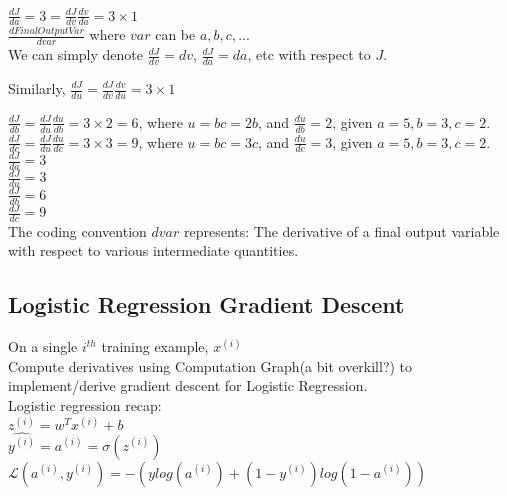 \documentclass{article}
\begin{document}
$\frac{dJ}{da} = 3 = \frac{dJ}{dv}\frac{dv}{da} = 3 \times 1$\\

$\frac{dFinalOutputVar}{dvar}$ where $var$ can be $a,b,c,...$\\

We can simply denote $\frac{dJ}{dv} = dv$,
$\frac{dJ}{da} = da$, etc with respect to $J$.

Similarly, $\frac{dJ}{du} = \frac{dJ}{dv}\frac{dv}{du} = 3\times 1$

$\frac{dJ}{db} = \frac{dJ}{du}\frac{du}{db} = 3 \times 2 = 6$, where $u=bc = 2b$, and $\frac{du}{db} = 2$, given $a=5, b=3, c=2$.\\

$\frac{dJ}{dc} = \frac{dJ}{du}\frac{du}{dc} = 3 \times 3 = 9$, where $u=bc = 3c$, and $\frac{du}{dc} = 3$, given $a=5, b=3, c=2$.\\

$\displaystyle \frac{dJ}{da} = 3$\\

$\displaystyle \frac{dJ}{du} = 3$\\

$\displaystyle \frac{dJ}{db} = 6$\\

$\displaystyle \frac{dJ}{dc} = 9$\\

The coding convention $dvar$ represents:
The derivative of a final output variable with respect to various intermediate quantities.

\newpage
\subsection{Logistic Regression Gradient Descent}

On a single $i^{th}$ training example, $x^{(i)}$\\

Compute derivatives using Computation Graph(a bit overkill?) to implement/derive gradient descent for Logistic Regression.\\

Logistic regression recap:\\

$z^{(i)} = w^{T}x^{(i)} +b$\\

$\hat{y^{(i)}} = a^{(i)} = \sigma(z^{(i)})$\\

$\mathcal{L}(a^{(i)},y^{(i)}) = -(ylog(a^{(i)}) + (1-y^{(i)})log(1-a^{(i)}))$\\
\end{document}
